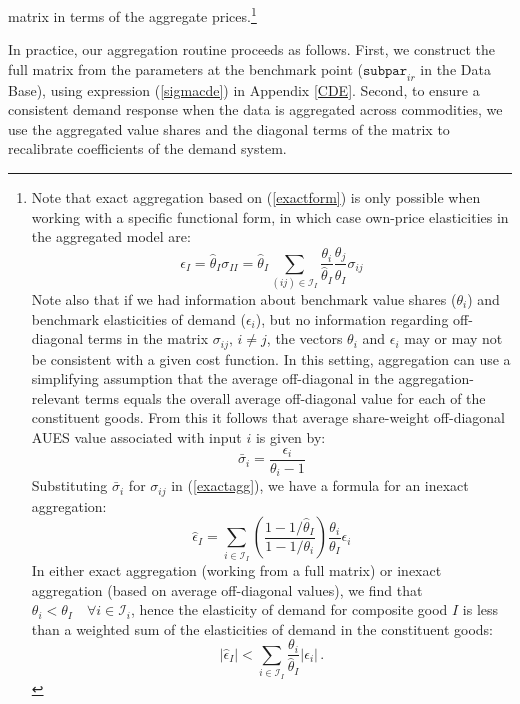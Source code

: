 matrix in terms of the aggregate prices.\footnote{Note that exact
aggregation based on (\ref{exactform}) is only possible when working
with a specific functional form, in which case own-price elasticities
in the aggregated model are:
\begin{equation}
\label{exactagg}
 \epsilon_{I} = \hat \theta_I \sigma_{II}  = \hat \theta_I \sum_{(ij) \in \mathcal{I}_I}
\frac{\theta_i}{\hat \theta_I} \frac{\theta_j}{\hat \theta_I} \sigma_{ij}
\end{equation}
Note also that if we had information about benchmark value shares
($\theta_i$) and benchmark elasticities of demand ($\epsilon_i$), but
no information regarding off-diagonal terms in the \AUES matrix
$\sigma_{ij},\, i\neq j$, the vectors $\theta_i$ and $\epsilon_i$ may
or may not be consistent with a given cost function. In this setting,
aggregation can use a simplifying assumption that the average
off-diagonal \AUES in the aggregation-relevant terms equals the
overall average off-diagonal value for each of the constituent goods.
From this it follows that average share-weight off-diagonal AUES value
associated with input $i$ is given by:
$$ \bar \sigma_{i} = \frac{\epsilon_i}{\theta_i - 1}$$
Substituting $\bar \sigma_i$ for $\sigma_{ij}$ in (\ref{exactagg}),
we have a
formula for an inexact aggregation:
\begin{equation}
\label{theformula}
\hat \epsilon_I = \sum_{i \in \mathcal{I}_I} \left( \frac{1-1/{\hat
\theta_I}}{1 - 1/\theta_i} \right) \frac{\theta_i}{\theta_I}
\epsilon_i
\end{equation}
In either exact aggregation (working from a full \AUES matrix) or
inexact aggregation (based on average off-diagonal values), we find
that $\theta_i < \theta_I \quad \forall i \in \mathcal{I}_i$,
hence the elasticity of demand for composite good $I$ is less
than a weighted sum of the elasticities of demand in the
constituent goods:
$$|\hat \epsilon_I| < \sum_{i \in \mathcal{I}_I} \frac{\theta_i}{\hat \theta_{I}}
|\epsilon_i|\,.$$}

In practice, our aggregation routine proceeds as follows. First, we
construct the full \AUES matrix from the \CDE parameters at the
benchmark point ($\texttt{subpar}_{ir}$ in the \GTAP Data Base), using
expression (\ref{sigmacde}) in Appendix \ref{CDE}. Second, to ensure a
consistent demand response when the data is aggregated across
commodities, we use the aggregated value shares and the diagonal terms
of the \AUES matrix to recalibrate coefficients of the \CDE demand
system.

